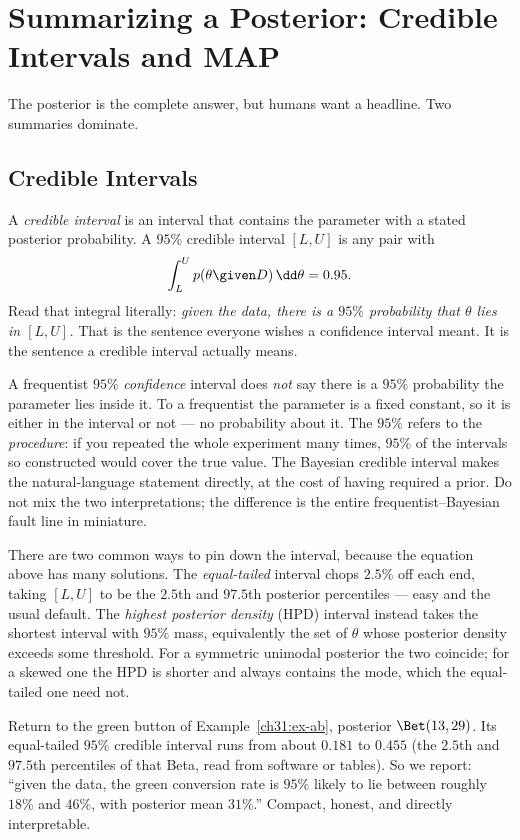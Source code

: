 \section{Summarizing a Posterior: Credible Intervals and MAP}
\label{ch31:summaries}

The posterior is the complete answer, but humans want a headline. Two summaries dominate.

\subsection{Credible Intervals}

A \emph{credible interval} is an interval that contains the parameter with a stated
posterior probability. A $95\%$ credible interval $[L,U]$ is any pair with
\[
  \int_{L}^{U} p(\theta\given D)\,\dd\theta = 0.95.
\]
Read that integral literally: \emph{given the data, there is a $95\%$ probability that
$\theta$ lies in $[L,U]$.} That is the sentence everyone wishes a confidence interval
meant. It is the sentence a credible interval actually means.

\begin{trapbox}
A frequentist $95\%$ \emph{confidence} interval does \emph{not} say there is a $95\%$
probability the parameter lies inside it. To a frequentist the parameter is a fixed
constant, so it is either in the interval or not --- no probability about it. The $95\%$
refers to the \emph{procedure}: if you repeated the whole experiment many times, $95\%$ of
the intervals so constructed would cover the true value. The Bayesian credible interval
makes the natural-language statement directly, at the cost of having required a prior. Do
not mix the two interpretations; the difference is the entire frequentist--Bayesian
fault line in miniature.
\end{trapbox}

There are two common ways to pin down the interval, because the equation above has many
solutions. The \emph{equal-tailed} interval chops $2.5\%$ off each end, taking $[L,U]$ to be
the $2.5$th and $97.5$th posterior percentiles --- easy and the usual default. The
\emph{highest posterior density} (HPD) interval instead takes the shortest interval with
$95\%$ mass, equivalently the set of $\theta$ whose posterior density exceeds some
threshold. For a symmetric unimodal posterior the two coincide; for a skewed one the HPD is
shorter and always contains the mode, which the equal-tailed one need not.

\begin{example}
\label{ch31:ex-credible}
Return to the green button of Example~\ref{ch31:ex-ab}, posterior $\Bet(13,29)$. Its
equal-tailed $95\%$ credible interval runs from about $0.181$ to $0.455$ (the $2.5$th and
$97.5$th percentiles of that Beta, read from software or tables). So we report: ``given the
data, the green conversion rate is $95\%$ likely to lie between roughly $18\%$ and $46\%$,
with posterior mean $31\%$.'' Compact, honest, and directly interpretable.
\end{example}

